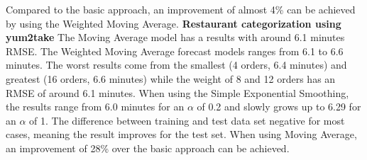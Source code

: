 Compared to the basic approach, an improvement of almost 4\% can be achieved by using the Weighted Moving Average.
\newline\newline\textbf{Restaurant categorization using yum2take}\newline
 The Moving Average model has a results with around 6.1 minutes RMSE. The Weighted Moving Average forecast models ranges from 6.1 to 6.6 minutes. The worst results come from the smallest (4 orders, 6.4 minutes) and greatest (16 orders, 6.6 minutes) while the weight of 8 and 12 orders has an RMSE of around 6.1 minutes. When using the Simple Exponential Smoothing, the results range from 6.0 minutes for an $\alpha$ of 0.2 and slowly grows up to 6.29 for an $\alpha$ of 1. The difference between training and test data set negative for most cases, meaning the result improves for the test set.\newline
 When using Moving Average, an improvement of 28\% over the basic approach can be achieved.
